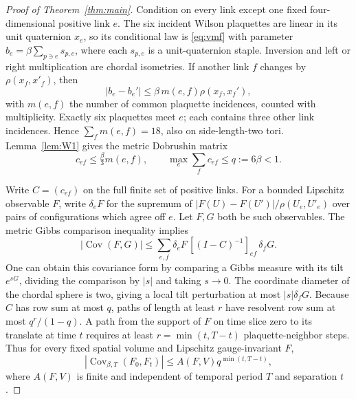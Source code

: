 \documentclass[11pt,a4paper]{article}
\numberwithin{equation}{section}
\newcommand{\Cov}{\operatorname{Cov}}
\begin{document}
\begin{proof}[Proof of Theorem~\ref{thm:main}]
Condition on every link except one fixed four-dimensional
positive link \(e\). The six incident Wilson plaquettes are
linear in its unit quaternion \(x_e\), so its conditional law
is \eqref{eq:vmf} with parameter
\(b_e=\beta\sum_{p\ni e}s_{p,e}\), where each \(s_{p,e}\)
is a unit-quaternion staple. Inversion and left or right
multiplication are chordal isometries. If another link \(f\)
changes by \(\rho(x_f,x'_f)\), then
\[
 |b_e-b_e'|\leq\beta\,m(e,f)\rho(x_f,x_f'),
\]
with \(m(e,f)\) the number of common plaquette incidences,
counted with multiplicity. Exactly six plaquettes meet \(e\);
each contains three other link incidences. Hence
\(\sum_fm(e,f)=18\), also on side-length-two tori.
Lemma~\ref{lem:W1} gives the metric Dobrushin matrix
\begin{equation}
 c_{ef}\leq\tfrac{\beta}{3}m(e,f),\qquad
 \max_e\sum_fc_{ef}\leq q:=6\beta<1.
                                                        \label{eq:dobrushin}
\end{equation}

Write \(C=(c_{ef})\) on the full finite set of positive links.
For a bounded Lipschitz observable \(F\), write \(\delta_eF\)
for the supremum of
\(|F(U)-F(U')|/\rho(U_e,U'_e)\) over pairs of configurations
which agree off \(e\). Let \(F,G\) both be such observables.
The metric Gibbs comparison inequality
\cite[Corollary~2.6]{RebeschiniVanHandel} implies
\begin{equation}
 |\Cov(F,G)|\leq
 \sum_{e,f}\delta_eF\,[(I-C)^{-1}]_{ef}\,\delta_fG.
                                                        \label{eq:cov}
\end{equation}
One can obtain this covariance form by comparing a Gibbs
measure with its tilt \(e^{sG}\), dividing the comparison
by \(|s|\) and taking \(s\to0\). The coordinate diameter
of the chordal sphere is two, giving a local tilt
perturbation at most \(|s|\delta_fG\).
Because \(C\) has row sum at most \(q\), paths of length
at least \(r\) have resolvent row sum at most
\(q^r/(1-q)\). A path from the support of \(F\) on
time slice zero to its translate at time \(t\) requires
at least \(r=\min(t,T-t)\) plaquette-neighbor steps.
Thus for every fixed spatial volume and Lipschitz
gauge-invariant \(F\),
\begin{equation}
 |\Cov_{\beta,T}(F_0,F_t)|
       \leq A(F,V)q^{\min(t,T-t)},             \label{eq:mix}
\end{equation}
where \(A(F,V)\) is finite and independent of temporal
period \(T\) and separation \(t\).


\end{proof}
\end{document}
